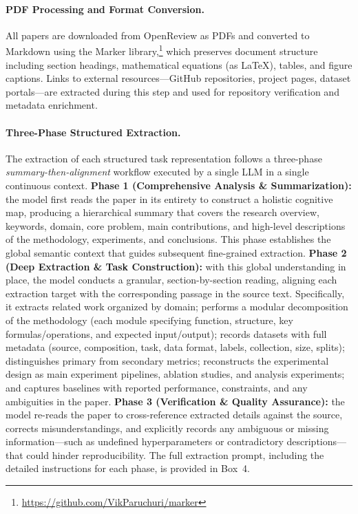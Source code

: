 \paragraph{PDF Processing and Format Conversion.}
All papers are downloaded from OpenReview as PDFs and converted to Markdown using the Marker library,\footnote{\url{https://github.com/VikParuchuri/marker}} which preserves document structure including section headings, mathematical equations (as \LaTeX{}), tables, and figure captions. Links to external resources---GitHub repositories, project pages, dataset portals---are extracted during this step and used for repository verification and metadata enrichment.

\paragraph{Three-Phase Structured Extraction.}
The extraction of each structured task representation follows a three-phase \textit{summary-then-alignment} workflow executed by a single LLM in a single continuous context. \textbf{Phase 1 (Comprehensive Analysis \& Summarization):} the model first reads the paper in its entirety to construct a holistic cognitive map, producing a hierarchical summary that covers the research overview, keywords, domain, core problem, main contributions, and high-level descriptions of the methodology, experiments, and conclusions. This phase establishes the global semantic context that guides subsequent fine-grained extraction. \textbf{Phase 2 (Deep Extraction \& Task Construction):} with this global understanding in place, the model conducts a granular, section-by-section reading, aligning each extraction target with the corresponding passage in the source text. Specifically, it extracts related work organized by domain; performs a modular decomposition of the methodology (each module specifying function, structure, key formulas/operations, and expected input/output); records datasets with full metadata (source, composition, task, data format, labels, collection, size, splits); distinguishes primary from secondary metrics; reconstructs the experimental design as main experiment pipelines, ablation studies, and analysis experiments; and captures baselines with reported performance, constraints, and any ambiguities in the paper. \textbf{Phase 3 (Verification \& Quality Assurance):} the model re-reads the paper to cross-reference extracted details against the source, corrects misunderstandings, and explicitly records any ambiguous or missing information---such as undefined hyperparameters or contradictory descriptions---that could hinder reproducibility. The full extraction prompt, including the detailed instructions for each phase, is provided in Box~4.

